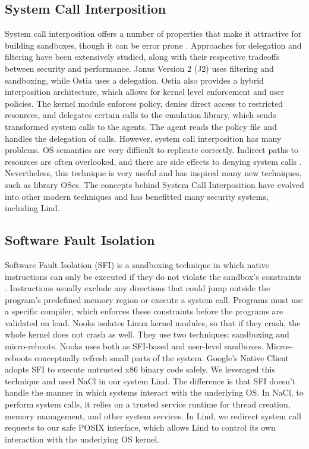 \subsection{System Call Interposition}

System call interposition offers a number of properties that make it attractive for building sandboxes, 
though it can be error prone \cite{SCI-04}. Approaches for delegation and filtering have been extensively studied, 
along with their respective tradeoffs between security and performance. 
Janus Version 2 (J2) \cite{Janus0:96, Janus:99} uses filtering and sandboxing, while Ostia \cite{SCI-04} uses a delegation. 
Ostia also provides a hybrid interposition architecture, which allows for kernel level enforcement and user policies. 
The kernel module enforces policy, denies direct access to restricted resources, 
and delegates certain calls to the emulation library, which sends transformed system calls to the agents. 
The agent reads the policy file and handles the delegation of calls. However, system call interposition has many problems. 
OS semantics are very difficult to replicate correctly. Indirect paths to resources are often overlooked, 
and there are side effects to denying system calls \cite{Problems-SCI}. 
Nevertheless, this technique is very useful and has inspired many new techniques, such as library OSes. 
The concepts behind System Call Interposition have evolved into other modern techniques 
and has benefitted many security systems, including Lind. 

\subsection{Software Fault Isolation}
Software Fault Isolation (SFI) is a sandboxing technique in which native instructions can only be executed 
if they do not violate the sandbox's constraints \cite{SFI:93}. Instructions usually exclude any directions that 
could jump outside the program's predefined memory region or execute a system call. 
Programs must use a specific compiler, which enforces these constraints before the programs are validated on load. 
Nooks \cite{Nooks:03} isolates Linux kernel modules, so that if they crash, the whole kernel does not crash as well. 
They use two techniques: sandboxing and micro-reboots. Nooks uses both as SFI-based and user-level sandboxes. 
Micros-reboots conceptually refresh small parts of the system. 
Google's Native Client \cite{NaCl-09} adopts SFI to execute untrusted x86 binary code safely. 
We leveraged this technique and used NaCl in our system Lind. The difference is that SFI doesn't handle the manner 
in which systems interact with the underlying OS. In NaCl, to perform system calls, 
it relies on a trusted service runtime for thread creation, memory management, and other system services. 
In Lind, we redirect system call requests to our safe POSIX interface, 
which allows Lind to control its own interaction with the underlying OS kernel.
